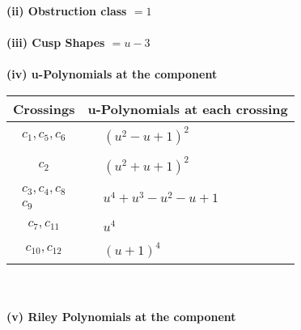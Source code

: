 \documentclass[1p]{elsarticle_modified}
\theoremstyle{definition}
\begin{document}
\flushleft \textbf{(ii) Obstruction class $= 1$}\\~\\
\flushleft \textbf{(iii) Cusp Shapes $= u-3$}\\~\\
\newpage\renewcommand{\arraystretch}{1}
\flushleft \textbf{(iv) u-Polynomials at the component}\newline \\
\begin{tabular}{m{50pt}|m{274pt}}
Crossings & \hspace{64pt}u-Polynomials at each crossing \\
\hline $$\begin{aligned}c_{1},c_{5},c_{6}\end{aligned}$$&$\begin{aligned}
&(u^2- u+1)^2
\end{aligned}$\\
\hline $$\begin{aligned}c_{2}\end{aligned}$$&$\begin{aligned}
&(u^2+u+1)^2
\end{aligned}$\\
\hline $$\begin{aligned}c_{3},c_{4},c_{8}\\c_{9}\end{aligned}$$&$\begin{aligned}
&u^4+u^3- u^2- u+1
\end{aligned}$\\
\hline $$\begin{aligned}c_{7},c_{11}\end{aligned}$$&$\begin{aligned}
&u^4
\end{aligned}$\\
\hline $$\begin{aligned}c_{10},c_{12}\end{aligned}$$&$\begin{aligned}
&(u+1)^4
\end{aligned}$\\
\hline
\end{tabular}\\~\\
\newpage\renewcommand{\arraystretch}{1}
\flushleft \textbf{(v) Riley Polynomials at the component}\newline \\
\end{document}
